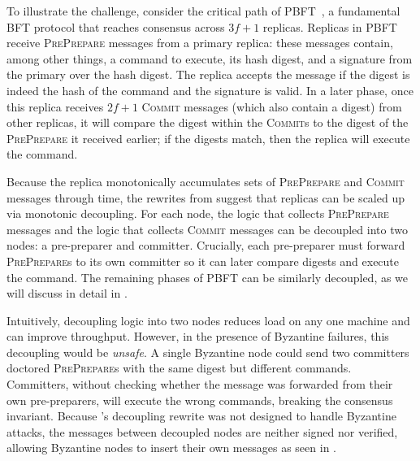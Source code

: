 To illustrate the challenge, consider the critical path of PBFT~\cite{pbft}, a fundamental BFT protocol that reaches consensus across $3f+1$ replicas.
Replicas in PBFT receive \textsc{PrePrepare} messages from a primary replica: these messages contain, among other things, a command to execute, its hash digest, and a signature from the primary over the hash digest.
The replica accepts the message if the digest is indeed the hash of the command and the signature is valid.
In a later phase, once this replica receives $2f+1$ \textsc{Commit} messages (which also contain a digest) from other replicas, it will compare the digest within the \textsc{Commit}s to the digest of the \textsc{PrePrepare} it received earlier; if the digests match, then the replica will execute the command.

Because the replica monotonically accumulates sets of \textsc{PrePrepare} and \textsc{Commit} messages through time, the rewrites from \sigmodpaper{} suggest that replicas can be scaled up via monotonic decoupling.
For each node, the logic that collects \textsc{PrePrepare} messages and the logic that collects \textsc{Commit} messages can be decoupled into two nodes: a pre-preparer and committer.
Crucially, each pre-preparer must forward \textsc{PrePrepare}s to its own committer so it can later compare digests and execute the command.
The remaining phases of PBFT can be similarly decoupled, as we will discuss in detail in .

Intuitively, decoupling logic into two nodes reduces load on any one machine and can improve throughput.
However, in the presence of Byzantine failures, this decoupling would be \emph{unsafe}.
A single Byzantine node could send two committers doctored \textsc{PrePrepare}s with the same digest but different commands.
Committers, without checking whether the message was forwarded from their own pre-preparers, will execute the wrong commands, breaking the consensus invariant.
Because \sigmodpaper{}'s decoupling rewrite was not designed to handle Byzantine attacks, the messages between decoupled nodes are neither signed nor verified, allowing Byzantine nodes to insert their own messages as seen in .


